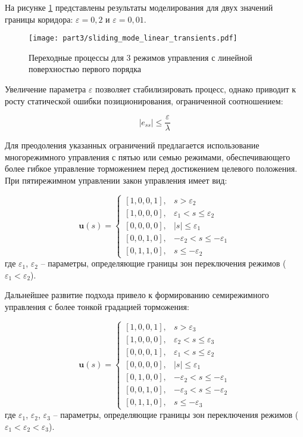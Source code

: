 На рисунке \ref{fig:ch3:transient_comparison_linear_mode3} представлены результаты моделирования
для двух значений границы коридора: $\varepsilon = 0,2$ и $\varepsilon = 0,01$.

\begin{figure}[h]
	\centering
	\texttt{[image: part3/sliding\_mode\_linear\_transients.pdf]}
	\caption{Переходные процессы для 3 режимов управления с линейной поверхностью первого порядка}
	\label{fig:ch3:transient_comparison_linear_mode3}
\end{figure}

Увеличение параметра $\varepsilon$ позволяет стабилизировать процесс, однако приводит к
росту статической ошибки позиционирования, ограниченной соотношением:

\begin{equation}
	|e_{ss}| \leq \frac{\varepsilon}{\lambda}
\end{equation}

Для преодоления указанных ограничений предлагается использование многорежимного управления
с пятью или семью режимами, обеспечивающего более гибкое управление торможением
перед достижением целевого положения. При пятирежимном управлении закон управления имеет вид:

\begin{equation}\label{eq:control_law_5_mode}
	\mathbf{u}(s) = \begin{cases}
		[1,0,0,1], & s > \varepsilon_2                      \\
		[1,0,0,0], & \varepsilon_1 < s \leq \varepsilon_2   \\
		[0,0,0,0], & |s| \leq \varepsilon_1                 \\
		[0,0,1,0], & -\varepsilon_2 < s \leq -\varepsilon_1 \\
		[0,1,1,0], & s \leq -\varepsilon_2
	\end{cases}
\end{equation}
где $\varepsilon_1$, $\varepsilon_2$ -- параметры, определяющие границы зон переключения режимов ($\varepsilon_1 < \varepsilon_2$).

Дальнейшее развитие подхода привело к формированию семирежимного управления с более тонкой градацией торможения:

\begin{equation}\label{eq:control_law_7_mode}
	\mathbf{u}(s) = \begin{cases}
		[1,0,0,1], & s > \varepsilon_3                      \\
		[1,0,0,0], & \varepsilon_2 < s \leq \varepsilon_3   \\
		[0,0,0,1], & \varepsilon_1 < s \leq \varepsilon_2   \\
		[0,0,0,0], & |s| \leq \varepsilon_1                 \\
		[0,1,0,0], & -\varepsilon_2 < s \leq -\varepsilon_1 \\
		[0,0,1,0], & -\varepsilon_3 < s \leq -\varepsilon_2 \\
		[0,1,1,0], & s \leq -\varepsilon_3
	\end{cases}
\end{equation}
где $\varepsilon_1$, $\varepsilon_2$, $\varepsilon_3$ -- параметры, определяющие границы зон переключения режимов ($\varepsilon_1 < \varepsilon_2 < \varepsilon_3$).

